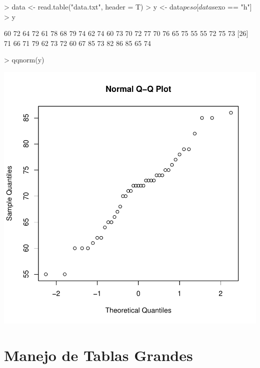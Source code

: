\documentclass[12pt]{article}
\begin{document}
\begin{Schunk}
\begin{Sinput}
> data <- read.table("data.txt", header = T)
> y <- data$peso[data$sexo == "h"]
> y
\end{Sinput}
\begin{Soutput}
 [1] 60 72 64 72 61 78 68 79 74 62 74 60 73 70 72 77 70 76 65 75 55 55 72 75 73
[26] 71 66 71 79 62 73 72 60 67 85 73 82 86 85 65 74
\end{Soutput}
\end{Schunk}
\begin{Schunk}
\begin{Sinput}
> qqnorm(y)
\end{Sinput}
\end{Schunk}
\includegraphics{ensayo-021}
  
  \section*{Manejo de Tablas Grandes}
\end{document}
